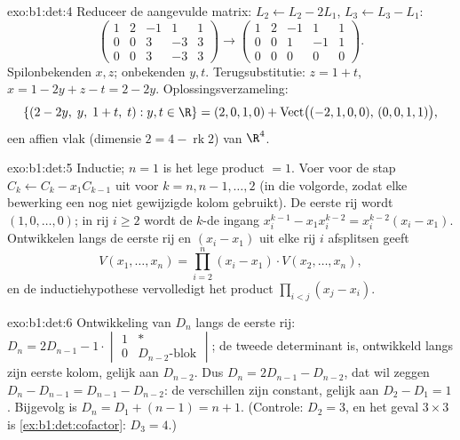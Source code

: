 \begin{solution}{exo:b1:det:4}
Reduceer de aangevulde matrix: $L_2 \leftarrow L_2 - 2L_1$, $L_3
\leftarrow L_3 - L_1$:
\[
\begin{pmatrix}
1 & 2 & -1 & 1 & 1\\
0 & 0 & 3 & -3 & 3\\
0 & 0 & 3 & -3 & 3
\end{pmatrix}
\to
\begin{pmatrix}
1 & 2 & -1 & 1 & 1\\
0 & 0 & 1 & -1 & 1\\
0 & 0 & 0 & 0 & 0
\end{pmatrix}.
\]
Spilonbekenden $x, z$;  onbekenden $y, t$. Terugsubstitutie:
$z = 1 + t$, $x = 1 - 2y + z - t = 2 - 2y$.
Oplossingsverzameling:
\[
\{(2 - 2y,\; y,\; 1 + t,\; t) : y, t \in \R\}
= (2, 0, 1, 0) + \operatorname{Vect}\bigl((-2,1,0,0),\,
(0,0,1,1)\bigr),
\]
een affien vlak (dimensie $2 = 4 - \operatorname{rk} 2$) van $\R^4$.
\end{solution}

\begin{solution}{exo:b1:det:5}
Inductie; $n = 1$ is het lege product $= 1$. Voer voor de stap $C_k
\leftarrow C_k - x_1 C_{k-1}$ uit voor $k = n, n-1, \dots, 2$ (in
die volgorde, zodat elke bewerking een nog niet gewijzigde kolom
gebruikt). De eerste rij wordt $(1, 0, \dots, 0)$; in rij $i \geq 2$
wordt de $k$-de ingang $x_i^{k-1} - x_1 x_i^{k-2} = x_i^{k-2}(x_i -
x_1)$. Ontwikkelen langs de eerste rij en $(x_i - x_1)$ uit elke rij
$i$ afsplitsen geeft
\[
V(x_1, \dots, x_n)
= \prod_{i=2}^{n} (x_i - x_1)\cdot V(x_2, \dots, x_n),
\]
en de inductiehypothese vervolledigt het product $\prod_{i<j}(x_j -
x_i)$.
\end{solution}

\begin{solution}{exo:b1:det:6}
Ontwikkeling van $D_n$ langs de eerste rij: $D_n = 2 D_{n-1} -
1\cdot\begin{vmatrix} 1 & \ast\\ 0 & D_{n-2}\text{-blok}
\end{vmatrix}$; de tweede determinant is, ontwikkeld langs zijn
eerste kolom, gelijk aan $D_{n-2}$. Dus $D_n = 2D_{n-1} - D_{n-2}$,
dat wil zeggen $D_n - D_{n-1} = D_{n-1} - D_{n-2}$: de verschillen
zijn constant, gelijk aan $D_2 - D_1 = 1$. Bijgevolg is $D_n = D_1 +
(n - 1) = n + 1$. (Controle: $D_2 = 3$, en het geval $3\times3$ is
\cref{ex:b1:det:cofactor}: $D_3 = 4$.)
\end{solution}

